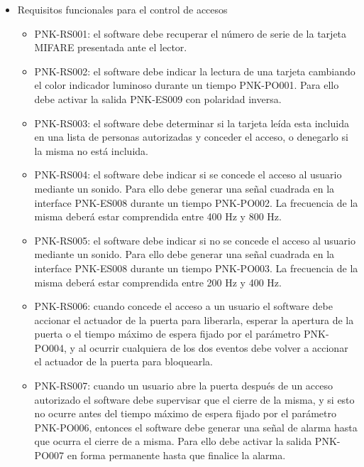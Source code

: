 \begin{itemize}
	\item Requisitos funcionales para el control de accesos
	
	\begin{itemize}
		\item PNK-RS001: el software debe recuperar el número de serie de la tarjeta MIFARE presentada ante el lector.

		\item PNK-RS002: el software debe indicar la lectura de una tarjeta cambiando el color indicador luminoso durante un tiempo PNK-PO001. Para ello debe activar la salida PNK-ES009 con polaridad inversa.

		\item PNK-RS003: el software debe determinar si la tarjeta leída esta incluida en una lista de personas autorizadas y conceder el acceso, o denegarlo si la misma no está incluida.

		\item PNK-RS004: el software debe indicar si se concede el acceso al usuario mediante un sonido. Para ello debe generar una señal cuadrada en la interface PNK-ES008 durante un tiempo PNK-PO002. La frecuencia de la misma deberá estar comprendida entre 400 Hz y 800 Hz.

		\item PNK-RS005: el software debe indicar si no se concede el acceso al usuario mediante un sonido. Para ello debe generar una señal cuadrada en la interface PNK-ES008 durante un tiempo PNK-PO003. La frecuencia de la misma deberá estar comprendida entre 200 Hz y 400 Hz.

		\item PNK-RS006: cuando concede el acceso a un usuario el software debe accionar el actuador de la puerta para liberarla, esperar la apertura de la puerta o el tiempo máximo de espera fijado por el parámetro PNK-PO004, y al ocurrir cualquiera de los dos eventos debe volver a accionar el actuador de la puerta para bloquearla.

		\item PNK-RS007: cuando un usuario abre la puerta después de un acceso autorizado el software debe supervisar que el cierre de la misma, y si esto no ocurre antes del tiempo máximo de espera fijado por el parámetro PNK-PO006, entonces el software debe generar una señal de alarma hasta que ocurra el cierre de a misma. Para ello debe activar la salida PNK-PO007 en forma permanente hasta que finalice la alarma.


\end{itemize}
\end{itemize}
